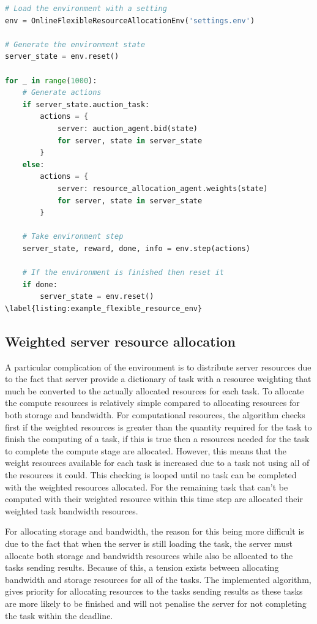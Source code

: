 \begin{lstlisting}[language=Python, frame=single, caption={An example for running the environment},captionpos=b]
# Load the environment with a setting
env = OnlineFlexibleResourceAllocationEnv('settings.env')

# Generate the environment state
server_state = env.reset()

for _ in range(1000):
    # Generate actions
    if server_state.auction_task:
        actions = {
            server: auction_agent.bid(state)
            for server, state in server_state
        }
    else:
        actions = {
            server: resource_allocation_agent.weights(state)
            for server, state in server_state
        }

    # Take environment step
    server_state, reward, done, info = env.step(actions)

    # If the environment is finished then reset it
    if done:
        server_state = env.reset()
\label{listing:example_flexible_resource_env}
\end{lstlisting}

\subsection{Weighted server resource allocation}\label{subsec:weighted-server-resource-allocation}
A particular complication of the environment is to distribute server resources due to the fact that server provide a
dictionary of task with a resource weighting that much be converted to the actually allocated resources for each task.
To allocate the compute resources is relatively simple compared to allocating resources for both storage and bandwidth.
For computational resources, the algorithm checks first if the weighted resources is greater than the quantity required for the task to finish the
computing of a task, if this is true then a resources needed for the task to complete the compute stage are allocated. However,
this means that the weight resources available for each task is increased due to a task not using all of the resources
it could. This checking is looped until no task can be completed with the weighted resources allocated.
For the remaining task that can't be computed with their weighted resource within this time step are allocated their
weighted task bandwidth resources.

For allocating storage and bandwidth, the reason for this being more difficult is due to the fact that when the server is still
loading the task, the server must allocate both storage and bandwidth resources while also be allocated
to the tasks sending results. Because of this, a tension exists between allocating bandwidth and storage resources for all of the tasks.
The implemented algorithm, gives priority for allocating resources to the tasks sending results as these tasks are more
likely to be finished and will not penalise the server for not completing the task within the deadline.

